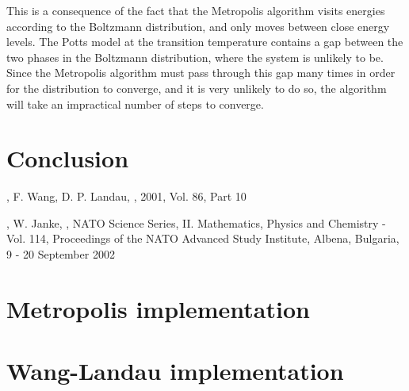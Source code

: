 \documentclass{article}
\begin{document}
This is a consequence of the fact that the Metropolis algorithm visits energies according to the Boltzmann distribution, and only moves between close energy levels.
The Potts model at the transition temperature contains a gap between the two phases in the Boltzmann distribution, where the system is unlikely to be.
Since the Metropolis algorithm must pass through this gap many times in order for the distribution to converge, and it is very unlikely to do so, the algorithm will take an impractical number of steps to converge.

\section{Conclusion}
\begin{thebibliography}{9}

,
\newblock F. Wang, D. P. Landau,
, 2001, Vol. 86, Part 10

,
\newblock W. Janke,
, NATO Science Series, II. Mathematics, Physics and Chemistry - Vol. 114, Proceedings of the NATO Advanced Study Institute, Albena, Bulgaria, 9 - 20 September 2002

\end{thebibliography}
\appendix
\section{Metropolis implementation}

\section{Wang-Landau implementation}

\end{document}
